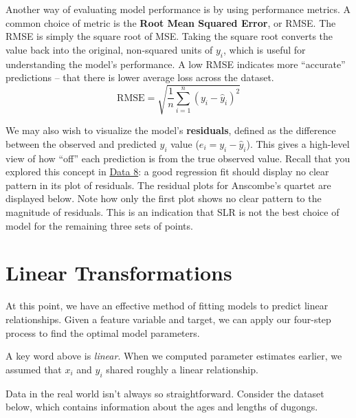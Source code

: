 \documentclass[
  letterpaper,
  DIV=11,
  numbers=noendperiod]{scrreprt}
\begin{document}
Another way of evaluating model performance is by using performance
metrics. A common choice of metric is the \textbf{Root Mean Squared
Error}, or RMSE. The RMSE is simply the square root of MSE. Taking the
square root converts the value back into the original, non-squared units
of \(y_i\), which is useful for understanding the model's performance. A
low RMSE indicates more ``accurate'' predictions -- that there is lower
average loss across the dataset.
\[\text{RMSE} = \sqrt{\frac{1}{n} \sum_{i=1}^n (y_i - \hat{y}_i)^2}\]

We may also wish to visualize the model's \textbf{residuals}, defined as
the difference between the observed and predicted \(y_i\) value
(\(e_i = y_i - \hat{y}_i\)). This gives a high-level view of how ``off''
each prediction is from the true observed value. Recall that you
explored this concept in
\href{https://inferentialthinking.com/chapters/15/5/Visual_Diagnostics.html?highlight=heteroscedasticity\#detecting-heteroscedasticity}{Data
8}: a good regression fit should display no clear pattern in its plot of
residuals. The residual plots for Anscombe's quartet are displayed
below. Note how only the first plot shows no clear pattern to the
magnitude of residuals. This is an indication that SLR is not the best
choice of model for the remaining three sets of points.

\hypertarget{linear-transformations}{%
\section{Linear Transformations}\label{linear-transformations}}

At this point, we have an effective method of fitting models to predict
linear relationships. Given a feature variable and target, we can apply
our four-step process to find the optimal model parameters.

A key word above is \emph{linear}. When we computed parameter estimates
earlier, we assumed that \(x_i\) and \(y_i\) shared roughly a linear
relationship.

Data in the real world isn't always so straightforward. Consider the
dataset below, which contains information about the ages and lengths of
dugongs.
\end{document}
